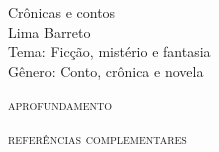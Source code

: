 \documentclass[smaller,professionalfonts,15pt]{beamer}
\begin{document}

										\begin{frame}\begin{raggedleft}
										\Huge 
Crônicas e contos						\\
										\huge 
Lima Barreto							\\
										\bigskip
										\normalsize
Tema: Ficção, mistério e fantasia		\\	
Gênero: Conto, crônica e novela			\\\vfill\hfill
\publishername
										\end{raggedleft}

\end{frame}


\begin{frame}
\begin{figure}
\hfill{}
\end{figure}
\end{frame}

\begin{frame}
\hfill\Huge
\textsc{aprofundamento}
\end{frame}


\begin{frame}
\hfill\Huge
\textsc{referências complementares}
\end{frame}
\end{document}
